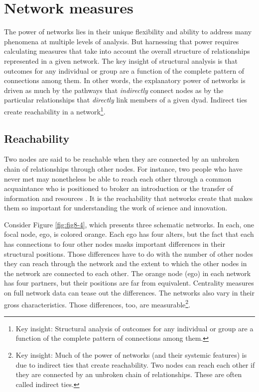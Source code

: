 \documentclass[]{krantz}
\begin{document}
\section{Network measures}\label{network-measures}

The power of networks lies in their unique flexibility and ability to
address many phenomena at multiple levels of analysis. But harnessing
that power requires calculating measures that take into account the
overall structure of relationships represented in a given network. The
key insight of structural analysis is that outcomes for any individual
or group are a function of the complete pattern of connections among
them. In other words, the explanatory power of networks is driven as
much by the pathways that \emph{indirectly} connect nodes as by the
particular relationships that \emph{directly} link members of a given
dyad. Indirect ties create reachability in a network\footnote{Key
  insight: Structural analysis of outcomes for any individual or group
  are a function of the complete pattern of connections among them.}.

\subsection{Reachability}\label{reachability}

Two nodes are said to be reachable when they are connected by an
unbroken chain of relationships through other nodes. For instance, two
people who have never met may nonetheless be able to reach each other
through a common acquaintance who is positioned to broker an
introduction \citep{obstfeld2005social} or the transfer of information
and resources \citep{burt2004structural}. It is the reachability that
networks create that makes them so important for understanding the work
of science and innovation.

Consider Figure \ref{fig:fig8-4}, which presents three schematic
networks. In each, one focal node, ego, is colored orange. Each ego has
four alters, but the fact that each has connections to four other nodes
masks important differences in their structural positions. Those
differences have to do with the number of other nodes they can reach
through the network and the extent to which the other nodes in the
network are connected to each other. The orange node (ego) in each
network has four partners, but their positions are far from equivalent.
Centrality measures on full network data can tease out the differences.
The networks also vary in their gross characteristics. Those
differences, too, are measurable\footnote{Key insight: Much of the power
  of networks (and their systemic features) is due to indirect ties that
  create reachability. Two nodes can reach each other if they are
  connected by an unbroken chain of relationships. These are often
  called indirect ties.}.
\end{document}

